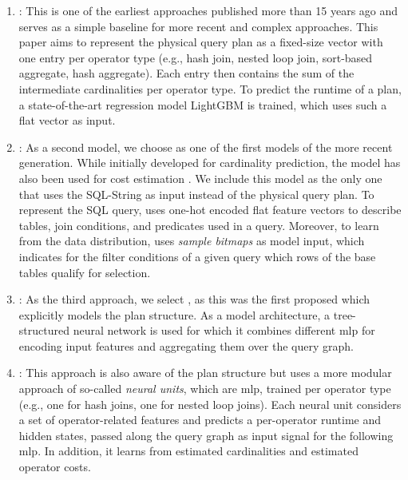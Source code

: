 \begin{enumerate}[leftmargin=*, nosep]
    \item \flatvector \cite{ganapathi2009}:
    This is one of the earliest approaches published more than 15 years ago and serves as a simple baseline for more recent and complex approaches.
    This paper aims to represent the physical query plan as a fixed-size vector with one entry per operator type (e.g., hash join, nested loop join, sort-based aggregate, hash aggregate). 
    Each entry then contains the sum of the intermediate cardinalities per operator type.
    To predict the runtime of a plan, a state-of-the-art regression model LightGBM \cite{lightgbm} is trained, which uses such a flat vector as input.

    \item \mscn \cite{kipf2019}:
    As a second model, we choose \mscn as one of the first models of the more recent generation.
    While initially developed for cardinality prediction, the model has also been used for cost estimation \cite{hilprecht2022, yang2023, sun2019}. 
    We include this model as the only one that uses the SQL-String as input instead of the physical query plan.
    To represent the SQL query, \mscn uses one-hot encoded flat feature vectors to describe tables, join conditions, and predicates used in a query.
    Moreover, to learn from the data distribution, \mscn uses \textit{sample bitmaps} as model input, which indicates for the filter conditions of a given query which rows of the base tables qualify for selection.

    \item \etoe \cite{sun2019}:
    As the third approach, we select \etoe, as this was the first proposed \lcm which explicitly models the plan structure. 
    As a model architecture, a tree-structured neural network is used for which it combines different \ac{mlp} for encoding input features and aggregating them over the query graph. 

    \item \qppnet \cite{marcus2019}:
    This approach is also aware of the plan structure but uses a more modular approach of so-called \textit{neural units}, which are \ac{mlp}, trained per operator type (e.g., one for hash joins, one for nested loop joins).
    Each neural unit considers a set of operator-related features and predicts a per-operator runtime and hidden states, passed along the query graph as input signal for the following \ac{mlp}. 
    In addition, it learns from estimated cardinalities and estimated operator costs.


\end{enumerate}
